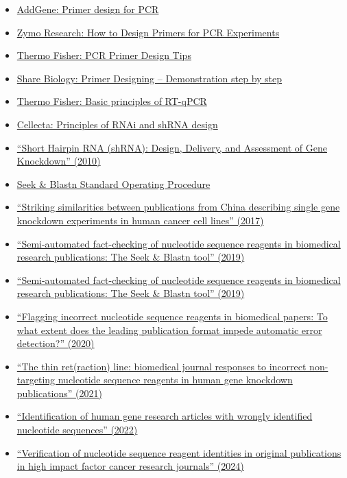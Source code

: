 \documentclass[letterpaper, 12pt]{article}
\begin{document}
\begin{itemize}
    \setlength\itemsep{-0.5em}
    \item \href{https://www.addgene.org/protocols/primer-design/}{AddGene: Primer design for PCR}
    \item \href{https://www.zymoresearch.com/blogs/blog/how-to-design-primers-for-pcr-experiments}{Zymo Research: How to Design Primers for PCR Experiments}
    \item \href{https://www.thermofisher.com/blog/behindthebench/pcr-primer-design-tips/}{Thermo Fisher: PCR Primer Design Tips}
    \item \href{https://sharebiology.com/primer-designing-demonstration-step-by-step/}{Share Biology: Primer Designing – Demonstration step by step}
    \item \href{https://www.thermofisher.com/us/en/home/brands/thermo-scientific/molecular-biology/molecular-biology-learning-center/molecular-biology-resource-library/spotlight-articles/basic-principles-rt-qpcr.html}{Thermo Fisher: Basic principles of RT-qPCR}
    \item \href{https://cellecta.com/pages/principles-of-rnai-and-shrna-design}{Cellecta: Principles of RNAi and shRNA design}
    \item \href{https://doi.org/10.1007/978-1-60761-657-3_10}{``Short Hairpin RNA (shRNA): Design, Delivery, and Assessment of Gene Knockdown'' (2010)}
    \item \href{https://dx.doi.org/10.17504/protocols.io.bjhpkj5n}{Seek \& Blastn Standard Operating Procedure}
    \item \href{https://doi.org/10.1007/s11192-016-2209-6}{``Striking similarities between publications from China describing single gene knockdown experiments in human cancer cell lines'' (2017)}
    \item \href{https://doi.org/10.1371/journal.pone.0213266}{``Semi-automated fact-checking of nucleotide sequence reagents in biomedical research publications: The Seek \& Blastn tool'' (2019)}
    \item \href{https://doi.org/10.1371/journal.pone.0213266}{``Semi-automated fact-checking of nucleotide sequence reagents in biomedical research publications: The Seek \& Blastn tool'' (2019)}
    \item \href{https://doi.org/10.1007/s11192-020-03463-z}{``Flagging incorrect nucleotide sequence reagents in biomedical papers: To what extent does the leading publication format impede automatic error detection?'' (2020)}
    \item \href{https://doi.org/10.1007/s11192-021-03871-9}{``The thin ret(raction) line: biomedical journal responses to incorrect non-targeting nucleotide sequence reagents in human gene knockdown publications'' (2021)}
    \item \href{https://doi.org/10.26508/lsa.202101203}{``Identification of human gene research articles with wrongly identified nucleotide sequences'' (2022)}
    \item \href{https://doi.org/10.1007/s00210-023-02846-2}{``Verification of nucleotide sequence reagent identities in original publications in high impact factor cancer research journals'' (2024)}
\end{itemize}
\end{document}
